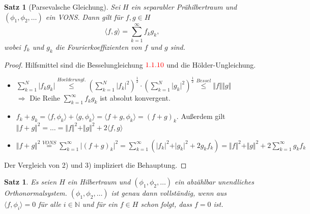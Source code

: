 \documentclass[12pt,titlepage]{article}
\newtheorem{satz}[zahl]{Satz}
\numberwithin{equation}{section}
\begin{document}
\begin{satz}[Parsevalsche Gleichung]
Sei $H$ ein separabler Prähilbertraum und $(\phi_1,\phi_2,\ldots)$ ein VONS. Dann gilt für $f,g \in H$
\[
\langle f,g\rangle =\sum_{k=1}^{\infty}f_k g_k,
\]
wobei $f_k$ und $g_k$ die Fourierkoeffizienten von $f$ und $g$ sind.
\end{satz}
\begin{proof}
Hilfsmittel sind die Besselungleichung $\textcolor{red}{1.1.10}$ und die Hölder-Ungleichung.
\begin{itemize}
\item $\sum_{k=1}^N \vert f_kg_k\vert\overset{Hoelderungl.}{\leq} \left( \sum_{k=1}^N \vert f_k\vert^2\right)^\frac{1}{2}\cdot \left( \sum_{k=1}^N \vert g_k\vert^2\right)^\frac{1}{2}\overset{Bessel}{\leq}\Vert f\Vert \Vert g\Vert$\\
$\Rightarrow$ Die Reihe $\sum_{k=1}^{\infty}f_kg_k$ ist absolut konvergent.
\item $f_k+g_k=\langle f,\phi_k\rangle +\langle g,\phi_k\rangle =\langle f+g,\phi_k\rangle =(f+g)_k$. Außerdem gilt $\Vert f+g\Vert^2=\ldots =\Vert f \Vert^2+\Vert g\Vert^2+ 2\langle f,g \rangle$
\item $\Vert f+g\Vert^2 \overset{VONS}{=}\sum_{k=1}^{\infty}\vert(f+g)_k\vert^2=\sum_{k=1}^{\infty} (\vert f_k\vert^2+\vert g_k \vert^2+2g_kf_k)=\Vert f\Vert^2+\Vert g\Vert^2+2\sum_{k=1}^{\infty}g_kf_k $
\end{itemize}
Der Vergleich von 2) und 3) impliziert die Behauptung.
\end{proof}
\begin{satz}
Es seien $H$ ein Hilbertraum und $(\phi_1,\phi_2,\ldots)$ ein abzählbar unendliches Orthonormalsystem. $(\phi_1,\phi_2,\ldots)$ ist genau dann vollständig, wenn aus $\langle f,\phi_i \rangle=0$ für alle $i\in \mathbb{N}$ und für ein $f\in H$ schon folgt, dass $f=0$ ist.
\end{satz}
\end{document}
